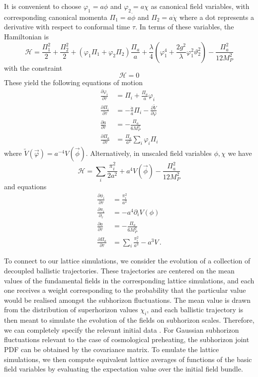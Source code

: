 It is convenient to choose $\varphi_1 = a\phi$ and $\varphi_2 = a\chi$ as canonical field variables, with corresponding canonical momenta $\Pi_1 = a\dot{\phi}$ and $\Pi_2=a\dot{\chi}$ where a dot represents a derivative with respect to conformal time $\tau$.
In terms of these variables, the Hamiltonian is
\begin{equation}
  \mathcal{H} = \frac{\Pi_1^2}{2} + \frac{\Pi_2^2}{2} + \left(\varphi_1\Pi_1 + \varphi_2\Pi_2\right)\frac{\Pi_a}{a} + \frac{\lambda}{4}\left(\varphi_1^4 + \frac{2g^2}{\lambda}\varphi_1^2\vartheta_2^2 \right) - \frac{\Pi_a^2}{12 M_P^2}
\end{equation}
with the constraint
\begin{equation}
  \mathcal{H} = 0
\end{equation}
These yield the following equations of motion
\begin{align}\label{eqn:eom_scale}
  \frac{\partial\varphi_i}{\partial\tau} &= \Pi_i + \frac{\Pi_a}{a}\varphi_i \\
  \frac{\partial\Pi_i}{\partial\tau}     &= -\frac{\dot{a}}{a}\Pi_i - \frac{\partial \tilde{V}}{\partial\varphi} \\
  \frac{\partial a}{\partial\tau}        &= -\frac{\Pi_a}{6M_P^2} \\
  \frac{\partial\Pi_a}{\partial\tau}     &= \frac{\Pi_a}{a^2}\sum_i\varphi_i\Pi_i
\end{align}
where $\tilde{V}(\vec{\varphi}) = a^{-4}V(\vec{\phi})$.
Alternatively, in unscaled field variables $\phi,\chi$ we have
\begin{equation}
  \mathcal{H} = \sum_i\frac{\pi_i^2}{2a^2} + a^4V(\vec{\phi}) - \frac{\Pi_a^2}{12M_P^2}
\end{equation}
and equations
\begin{align}\label{eqn:eom_noscale}
  \frac{\partial\phi_i}{\partial\tau} &= \frac{\pi_i^2}{a^2} \\
  \frac{\partial\pi_i}{\partial_\tau} &= -a^4 \partial_iV(\phi) \\
  \frac{\partial a}{\partial\tau}     &= -\frac{\Pi_a}{6M_P^2} \\
  \frac{\partial\Pi_a}{\partial\tau}  &= \sum_i\frac{\pi_i^2}{a^3} - a^3V \, .
\end{align}

To connect to our lattice simulations, we consider the evolution of a collection of decoupled ballistic trajectories.
These trajectories are centered on the mean values of the fundamental fields in the corresponding lattice simulations, and each one receives a weight corresponding to the probability that the particular value would be realised amongst the subhorizon fluctuations.
The mean value is drawn from the distribution of superhorizon values $\chi_i$, and each ballistic trajectory is then meant to simulate the evolution of the fields on subhorizon scales.
Therefore, we can completely specify the relevant initial data .
For Gaussian subhorizon fluctuations relevant to the case of cosmological preheating, the subhorizon joint PDF can be obtained by the covariance matrix.
To emulate the lattice simulations, we then compute equivalent lattice averages of functions of the basic field variables by evaluating the expectation value over the initial field bundle.

